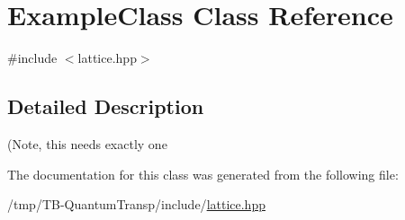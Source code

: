 \hypertarget{classExampleClass}{}\section{Example\+Class Class Reference}
\label{classExampleClass}


{\ttfamily \#include $<$lattice.\+hpp$>$}



\subsection{Detailed Description}
(Note, this needs exactly one 

The documentation for this class was generated from the following file\+:\begin{DoxyCompactItemize}
\item 
/tmp/\+T\+B-\/\+Quantum\+Transp/include/\hyperlink{lattice_8hpp}{lattice.\+hpp}\end{DoxyCompactItemize}

